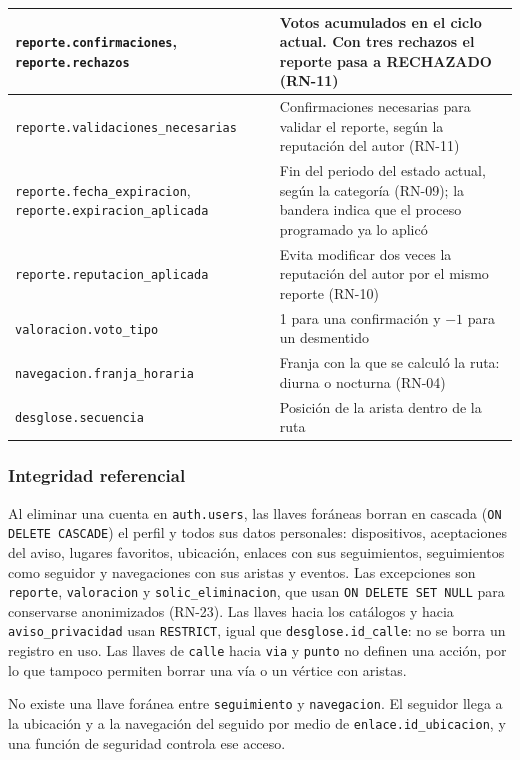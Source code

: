 \begin{table}[H]
\begin{tabular}{|D{0.36\textwidth}|D{0.56\textwidth}|}
\texttt{reporte.\allowbreak confirmaciones}, \texttt{reporte.\allowbreak rechazos} & Votos acumulados en el ciclo actual. Con tres rechazos el reporte pasa a RECHAZADO (RN-11) \\ \hline
\texttt{reporte.\allowbreak validaciones\_necesarias} & Confirmaciones necesarias para validar el reporte, según la reputación del autor (RN-11) \\ \hline
\texttt{reporte.\allowbreak fecha\_expiracion}, \texttt{reporte.\allowbreak expiracion\_aplicada} & Fin del periodo del estado actual, según la categoría (RN-09); la bandera indica que el proceso programado ya lo aplicó \\ \hline
\texttt{reporte.\allowbreak reputacion\_aplicada} & Evita modificar dos veces la reputación del autor por el mismo reporte (RN-10) \\ \hline
\texttt{valoracion.\allowbreak voto\_tipo} & 1 para una confirmación y $-1$ para un desmentido \\ \hline
\texttt{navegacion.\allowbreak franja\_horaria} & Franja con la que se calculó la ruta: diurna o nocturna (RN-04) \\ \hline
\texttt{desglose.\allowbreak secuencia} & Posición de la arista dentro de la ruta \\ \hline
\end{tabular}
\end{table}

\subsubsection{Integridad referencial}

Al eliminar una cuenta en \texttt{auth.\allowbreak users}, las llaves foráneas borran en cascada (\texttt{ON DELETE CASCADE}) el perfil y todos sus datos personales: dispositivos, aceptaciones del aviso, lugares favoritos, ubicación, enlaces con sus seguimientos, seguimientos como seguidor y navegaciones con sus aristas y eventos. Las excepciones son \texttt{reporte}, \texttt{valoracion} y \texttt{solic\_eliminacion}, que usan \texttt{ON DELETE SET NULL} para conservarse anonimizados (RN-23). Las llaves hacia los catálogos y hacia \texttt{aviso\_privacidad} usan \texttt{RESTRICT}, igual que \texttt{desglose.\allowbreak id\_calle}: no se borra un registro en uso. Las llaves de \texttt{calle} hacia \texttt{via} y \texttt{punto} no definen una acción, por lo que tampoco permiten borrar una vía o un vértice con aristas.

No existe una llave foránea entre \texttt{seguimiento} y \texttt{navegacion}. El seguidor llega a la ubicación y a la navegación del seguido por medio de \texttt{enlace.\allowbreak id\_ubicacion}, y una función de seguridad controla ese acceso.

